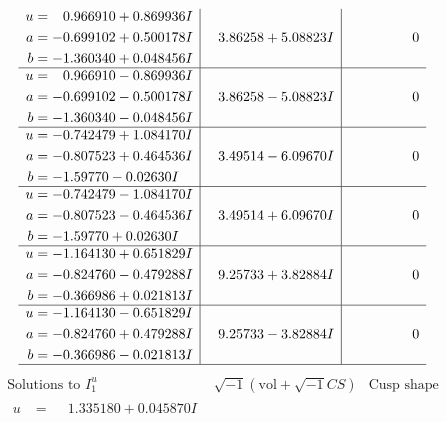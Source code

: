 \documentclass[1p]{elsarticle_modified}
\theoremstyle{definition}
\newcommand{\I}{\sqrt{-1}}
\begin{document}
$$\begin{array}{c|c|c}
\begin{aligned}
u &= \phantom{-}0.966910 + 0.869936 I \\
a &= -0.699102 + 0.500178 I \\
b &= -1.360340 + 0.048456 I\end{aligned}
 & \phantom{-}3.86258 + 5.08823 I & \phantom{-0.000000 } 0 \\ \hline\begin{aligned}
u &= \phantom{-}0.966910 - 0.869936 I \\
a &= -0.699102 - 0.500178 I \\
b &= -1.360340 - 0.048456 I\end{aligned}
 & \phantom{-}3.86258 - 5.08823 I & \phantom{-0.000000 } 0 \\ \hline\begin{aligned}
u &= -0.742479 + 1.084170 I \\
a &= -0.807523 + 0.464536 I \\
b &= -1.59770 - 0.02630 I\end{aligned}
 & \phantom{-}3.49514 - 6.09670 I & \phantom{-0.000000 } 0 \\ \hline\begin{aligned}
u &= -0.742479 - 1.084170 I \\
a &= -0.807523 - 0.464536 I \\
b &= -1.59770 + 0.02630 I\end{aligned}
 & \phantom{-}3.49514 + 6.09670 I & \phantom{-0.000000 } 0 \\ \hline\begin{aligned}
u &= -1.164130 + 0.651829 I \\
a &= -0.824760 - 0.479288 I \\
b &= -0.366986 + 0.021813 I\end{aligned}
 & \phantom{-}9.25733 + 3.82884 I & \phantom{-0.000000 } 0 \\ \hline\begin{aligned}
u &= -1.164130 - 0.651829 I \\
a &= -0.824760 + 0.479288 I \\
b &= -0.366986 - 0.021813 I\end{aligned}
 & \phantom{-}9.25733 - 3.82884 I & \phantom{-0.000000 } 0\\
 \hline 
 \end{array}$$\newpage$$\begin{array}{c|c|c}  
\text{Solutions to }I^u_{1}& \I (\text{vol} + \sqrt{-1}CS) & \text{Cusp shape}\\
 \hline 
\begin{aligned}
u &= \phantom{-}1.335180 + 0.045870 I \\

\end{aligned}
\end{array}$$
\end{document}
